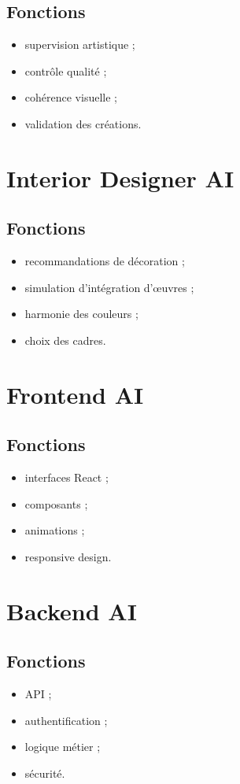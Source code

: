 \documentclass[12pt,a4paper,oneside]{book}
\begin{document}
\subsection{Fonctions}
\begin{itemize}
\item supervision artistique ;
\item contrôle qualité ;
\item cohérence visuelle ;
\item validation des créations.
\end{itemize}

\section{Interior Designer AI}
\subsection{Fonctions}
\begin{itemize}
\item recommandations de décoration ;
\item simulation d'intégration d'œuvres ;
\item harmonie des couleurs ;
\item choix des cadres.
\end{itemize}

\section{Frontend AI}
\subsection{Fonctions}
\begin{itemize}
\item interfaces React ;
\item composants ;
\item animations ;
\item responsive design.
\end{itemize}

\section{Backend AI}
\subsection{Fonctions}
\begin{itemize}
\item API ;
\item authentification ;
\item logique métier ;
\item sécurité.
\end{itemize}
\end{document}
